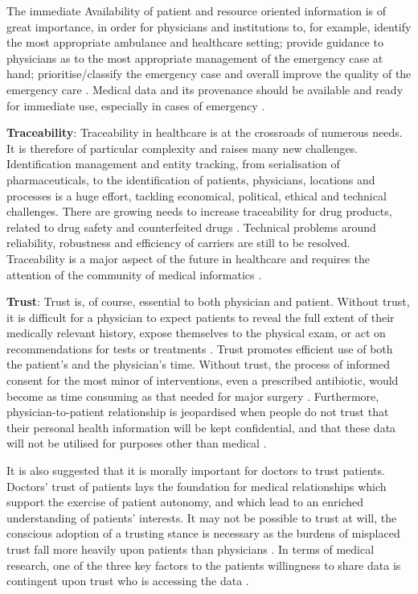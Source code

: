 The immediate Availability of patient and resource oriented information is of great importance, in order for physicians and institutions to, for example, identify the most appropriate ambulance and healthcare setting; provide guidance to physicians as to the most appropriate management of the emergency case at hand; prioritise/classify the emergency case and overall improve the quality of the emergency care \cite{availability_emergency}. Medical data and its provenance should be available and ready for immediate use, especially in cases of emergency \cite{req_health1}. \newline

\textbf{Traceability}: Traceability in healthcare is at the crossroads of numerous needs. It is therefore of particular complexity and raises many new challenges. Identification management and entity tracking, from serialisation of pharmaceuticals, to the identification of patients, physicians, locations and processes is a huge effort, tackling economical, political, ethical and technical challenges. There are growing needs to increase traceability for drug products, related to drug safety and counterfeited drugs \cite{drug_tracing}. Technical problems around reliability, robustness and efficiency of carriers are still to be resolved. Traceability is a major aspect of the future in healthcare and requires the attention of the community of medical informatics \cite{health_traceability}. \newline

\textbf{Trust}: Trust is, of course, essential to both physician and patient. Without trust, it is difficult for a physician to expect patients to reveal the full extent of their medically relevant history, expose themselves to the physical exam, or act on recommendations for tests or treatments \cite{trust_20,trust_21}.  Trust promotes efficient use of both the patient's and the physician's time. Without trust, the process of informed consent for the most minor of interventions, even a prescribed antibiotic, would become as time consuming as that needed for major surgery \cite{trust_distrust_trustworthiness}. Furthermore, physician-to-patient relationship is jeopardised when people do not trust that their personal health information will be kept confidential, and that these data will not be utilised for purposes other than medical \cite{req_health1}. 

It is also suggested that it is morally important for doctors to trust patients. Doctors' trust of patients lays the foundation for medical relationships which support the exercise of patient autonomy, and which lead to an enriched understanding of patients' interests. It may not be possible to trust at will, the conscious adoption of a trusting stance is necessary as the burdens of misplaced trust fall more heavily upon patients than physicians \cite{doctors_trust_patients}. In terms of medical research, one of the three key factors to the patients willingness to share data is contingent upon trust who is accessing the data \cite{trust_med_research}. \newline

